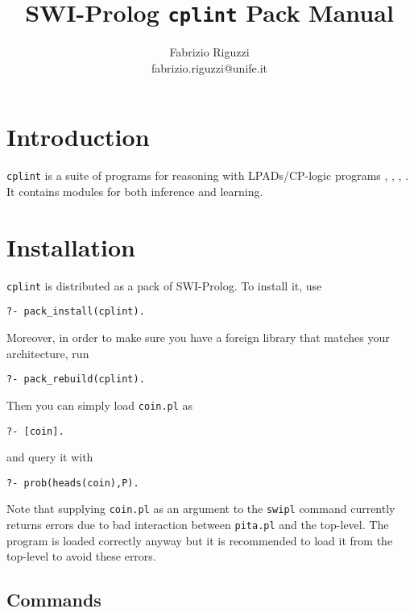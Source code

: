 \documentclass[a4paper,10pt]{article}
\begin{document}
\title{SWI-Prolog \texttt{cplint} Pack Manual}


\author{Fabrizio Riguzzi\\
fabrizio.riguzzi@unife.it}

\maketitle


\section{Introduction}


\texttt{cplint} is a suite of programs for reasoning with LPADs/CP-logic programs  \cite{VenVer03-TR}, \cite{VenVer04-ICLP04-IC},
\cite{VenDenBru-JELIA06},
\cite{DBLP:journals/tplp/VennekensDB09}. It contains modules for both inference and learning.

\section{Installation}
\texttt{cplint} is distributed as a pack of SWI-Prolog. To install it, use
\begin{verbatim}
?- pack_install(cplint).
\end{verbatim}
Moreover, in order to make sure you have a foreign library that matches your architecture, run
\begin{verbatim}
?- pack_rebuild(cplint). 
\end{verbatim}






Then you can simply load \texttt{coin.pl} as
\begin{verbatim}
?- [coin].
\end{verbatim}
and query it with
\begin{verbatim}
?- prob(heads(coin),P).
\end{verbatim}
Note that supplying \texttt{coin.pl} as an argument to the \texttt{swipl} command currently returns errors due to bad interaction between \texttt{pita.pl} and the top-level.
The program is loaded correctly anyway but it is recommended to load it from the top-level to avoid these errors.








\subsection{Commands}
\end{document}
